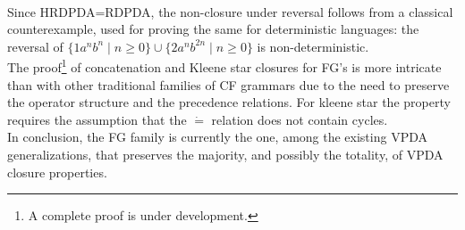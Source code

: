 \documentclass[3p,11pt]{elsarticle}
\begin{document}
\\
Since HRDPDA=RDPDA, the non-closure under reversal follows from a classical counterexample, used for proving the same for deterministic languages: the reversal of $\{1a^n b^n \mid n\geq 0\} \cup \{2a^n b^{2n} \mid n\geq 0\}$ is non-deterministic.
\\
The proof\footnote{A complete proof is under development.}  of concatenation and Kleene star closures for FG's is more intricate than with other traditional families of CF grammars due to the need to preserve the operator structure and the precedence relations. For kleene star the property requires the assumption that the $\dot=$ relation does not contain cycles.
\\
In conclusion, the FG family is currently the one, among the existing VPDA generalizations, that preserves the majority, and possibly the totality, of VPDA closure properties.
\end{document}
